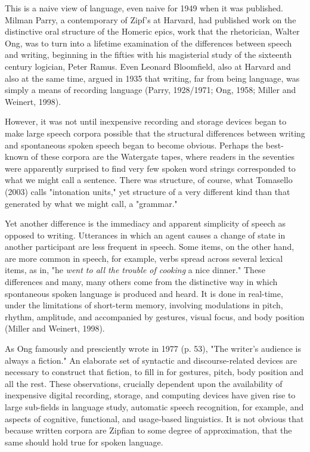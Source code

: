 \documentclass[12pt]{article}
\begin{document}
This is a naive view of language, even naive for 1949 when it was published.  Milman Parry, a contemporary of Zipf's at Harvard, had published work on the distinctive oral structure of the Homeric epics, work that the rhetorician, Walter Ong, was to turn into a lifetime examination of the differences between speech and writing, beginning in the fifties with his magisterial study of the sixteenth century logician, Peter Ramus.   Even Leonard Bloomfield, also at Harvard and also at the same time, argued in 1935 that writing, far from being language, was simply a means of recording language (Parry, 1928/1971; Ong, 1958; Miller and Weinert, 1998).  

However, it was not until inexpensive recording and storage devices began to make large speech corpora possible that the structural differences between writing and spontaneous spoken speech began to become obvious.   Perhaps the best-known of these corpora are the Watergate tapes, where readers in the seventies were apparently surprised to find very few spoken word strings corresponded to what we might call a sentence.  There was structure, of course, what Tomasello (2003) calls "intonation units," yet structure of a very different kind than that generated by what we might call, a "grammar."  

Yet another difference is the immediacy and apparent simplicity of speech as opposed to writing.   Utterances in which an agent causes a change of state in another participant are less frequent in speech.  Some items, on the other hand, are more common in speech, for example, verbs spread across several lexical items, as in, "he \emph{went to all the trouble of cooking} a nice dinner." These differences and many, many others come from the distinctive way in which spontaneous spoken language is produced and heard. It is done in real-time, under the limitations of short-term memory, involving modulations in pitch, rhythm, amplitude, and accompanied by gestures, visual focus, and body position (Miller and Weinert, 1998).  

As Ong famously and presciently wrote in 1977 (p. 53), "The writer's audience is always a fiction." An elaborate set of syntactic and discourse-related devices are necessary to construct that fiction, to fill in for gestures, pitch, body position and all the rest.  These observations, crucially dependent upon the availability of inexpensive digital recording, storage, and computing devices have given rise to large sub-fields in language study, automatic speech recognition, for example, and aspects of cognitive, functional, and usage-based linguistics. It is not obvious that because written corpora are Zipfian to some degree of approximation, that the same should hold true for spoken language.
\end{document}
